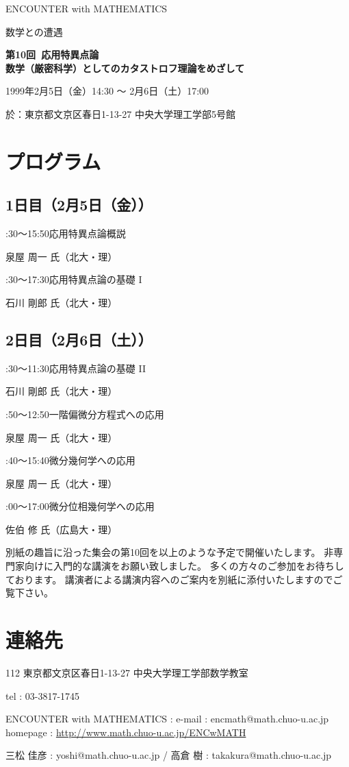 \documentclass[uplatex,dvipdfmx]{jlreq}
\newcommand{\talk}[3]{%
\noindent
#1\quad #2\par
\hspace*{2em}#3\par\smallskip
}
\newcommand{\EwMnumber}{第10回}
\newcommand{\EwMtitle}{応用特異点論\\[2mm]\large 数学（厳密科学）としてのカタストロフ理論をめざして}
\newcommand{\EwMdate}{1999年2月5日（金）14:30 ～ 2月6日（土）17:00}
\newcommand{\EwMplace}{東京都文京区春日1-13-27 中央大学理工学部5号館}
\newcommand{\EwMtitleblock}{

\vspace*{-5mm}

\begin{center}

{\Large ENCOUNTER with MATHEMATICS}

\vspace{2mm}

{\large 数学との遭遇}

\vspace{4mm}

{\Large \bfseries \EwMnumber\ \EwMtitle}

\vspace{4mm}

\EwMdate

\vspace{2mm}

於：\EwMplace

\end{center}

\vspace{2mm}

}
\begin{document}
\EwMtitleblock


\section*{プログラム}

\subsection*{1日目（2月5日（金））}

\talk
{14:30～15:50}
{応用特異点論概説}
{泉屋 周一 氏（北大・理）}

\talk
{16:30～17:30}
{応用特異点論の基礎 I}
{石川 剛郎 氏（北大・理）}

\subsection*{2日目（2月6日（土））}

\talk
{10:30～11:30}
{応用特異点論の基礎 II}
{石川 剛郎 氏（北大・理）}

\talk
{11:50～12:50}
{一階偏微分方程式への応用}
{泉屋 周一 氏（北大・理）}

\talk
{14:40～15:40}
{微分幾何学への応用}
{泉屋 周一 氏（北大・理）}

\talk
{16:00～17:00}
{微分位相幾何学への応用}
{佐伯 修 氏（広島大・理）}


\bigskip

別紙の趣旨に沿った集会の第10回を以上のような予定で開催いたします。  
非専門家向けに入門的な講演をお願い致しました。  
多くの方々のご参加をお待ちしております。  
講演者による講演内容へのご案内を別紙に添付いたしますのでご覧下さい。


\section*{連絡先}

112 東京都文京区春日1-13-27 中央大学理工学部数学教室  

tel : 03-3817-1745  

ENCOUNTER with MATHEMATICS : e-mail : encmath@math.chuo-u.ac.jp  
homepage : \url{http://www.math.chuo-u.ac.jp/ENCwMATH}  

三松 佳彦 : yoshi@math.chuo-u.ac.jp / 高倉 樹 : takakura@math.chuo-u.ac.jp
\end{document}
